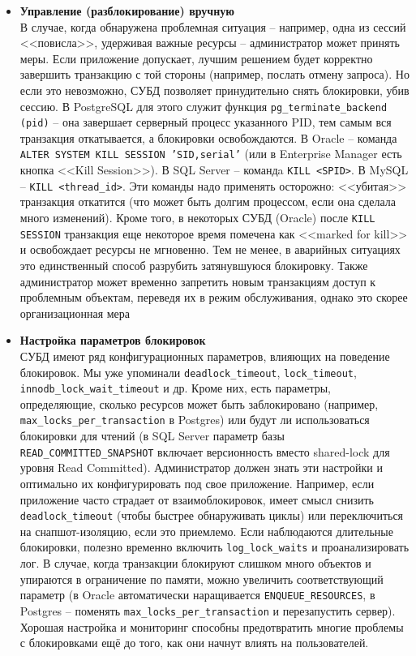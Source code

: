 \begin{itemize}
    \item \textbf{Управление (разблокирование) вручную} ~\\
    В случае, когда обнаружена проблемная ситуация – например, одна из сессий <<повисла>>, удерживая важные ресурсы – администратор может принять меры. Если приложение допускает, лучшим решением будет корректно завершить транзакцию с той стороны (например, послать отмену запроса). Но если это невозможно, СУБД позволяет принудительно снять блокировки, убив сессию. В PostgreSQL для этого служит функция \texttt{pg\_terminate\_backend (pid)} – она завершает серверный процесс указанного PID, тем самым вся транзакция откатывается, а блокировки освобождаются. В Oracle – команда \texttt{ALTER SYSTEM KILL SESSION 'SID,serial'} (или в Enterprise Manager есть кнопка <<Kill Session>>). В SQL Server – командa \texttt{KILL <SPID>}. В MySQL – \texttt{KILL <thread\_id>}. Эти команды надо применять осторожно: <<убитая>> транзакция откатится (что может быть долгим процессом, если она сделала много изменений). Кроме того, в некоторых СУБД (Oracle) после \texttt{KILL SESSION} транзакция еще некоторое время помечена как <<marked for kill>> и освобождает ресурсы не мгновенно. Тем не менее, в аварийных ситуациях это единственный способ разрубить затянувшуюся блокировку. Также администратор может временно запретить новым транзакциям доступ к проблемным объектам, переведя их в режим обслуживания, однако это скорее организационная мера
    \item \textbf{Настройка параметров блокировок} ~\\
    СУБД имеют ряд конфигурационных параметров, влияющих на поведение блокировок. Мы уже упоминали \texttt{deadlock\_timeout}, \texttt{lock\_timeout}, \texttt{innodb\_lock\_wait\_timeout} и др. Кроме них, есть параметры, определяющие, сколько ресурсов может быть заблокировано (например, \texttt{max\_locks\_per\_transaction} в Postgres) или будут ли использоваться блокировки для чтений (в SQL Server параметр базы \texttt{READ\_COMMITTED\_SNAPSHOT} включает версионность вместо shared-lock для уровня Read Committed). Администратор должен знать эти настройки и оптимально их конфигурировать под свое приложение. Например, если приложение часто страдает от взаимоблокировок, имеет смысл снизить \texttt{deadlock\_timeout} (чтобы быстрее обнаруживать циклы) или переключиться на снапшот-изоляцию, если это приемлемо. Если наблюдаются длительные блокировки, полезно временно включить \texttt{log\_lock\_waits} и проанализировать лог. В случае, когда транзакции блокируют слишком много объектов и упираются в ограничение по памяти, можно увеличить соответствующий параметр (в Oracle автоматически наращивается \texttt{ENQUEUE\_RESOURCES}, в Postgres – поменять \texttt{max\_locks\_per\_transaction} и перезапустить сервер). Хорошая настройка и мониторинг способны предотвратить многие проблемы с блокировками ещё до того, как они начнут влиять на пользователей.
 \end{itemize} 

